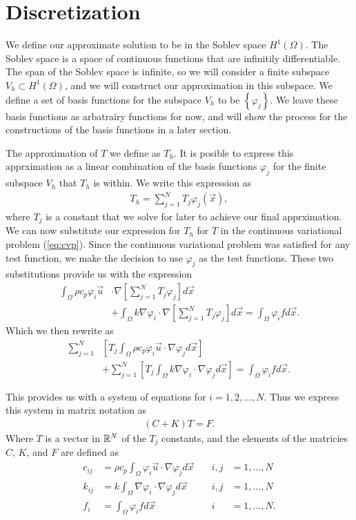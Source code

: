 \documentclass[../fem.tex]{subfiles}
\begin{document}
\section{Discretization}%
\label{sec:discretization}

We define our approximate solution to be in the Soblev space $H^1(\Omega)$. The
Soblev space is a space of continuous functions that are infinitily
differentiable. The span of the Soblev space is infinite, so we will consider a
finite subspace $V_h\subset H^1(\Omega)$, and we will construct our
approximation in this subspace. We define a set of basis functions for the
subspace $V_h$ to be $\left\{\varphi_j\right\}$. We leave these basis functions
as arbatrairy functions for now, and will show the process for the
constructions of the basis functions in a later section.

The approximation of $T$ we define as $T_h$. It is posible to express this
apprximation as a linear combination of the basis functions $\varphi_j$ for the
finite subspace $V_h$ that $T_h$ is within. We write this expression as
\begin{align}\label{eq:lin_approx}
  T_h=\sum_{j=1}^NT_j\varphi_j(\vec{x}),
\end{align}
where $T_j$ is a constant that we solve for later to achieve our final
apprximation. We can now substitute our expression for $T_h$ for $T$ in the
continuous variational problem (\ref{eq:cvp}). Since the continuous variational
problem was satisfied for any test function, we make the decision to use
$\varphi_j$ as the test functions. These two substitutions provide us with the
expression
\begin{align*}
  \int_\Omega\rho c_p \varphi_i\vec{u}&\cdot\nabla\left[\sum_{j=1}^NT_j\varphi_j\right]d\vec{x}\\
  &+\int_\Omega k\nabla
  \varphi_i\cdot\nabla\left[\sum_{j=1}^NT_j\varphi_j\right]d\vec{x}
  =\int_\Omega \varphi_ifd\vec{x}.
\end{align*}
Which we then rewrite as
\begin{align*}
  \sum_{j=1}^N&\left[T_j\int_\Omega\rho c_p\varphi_i\vec{u}\cdot\nabla\varphi_jd\vec{x}\right]\\
  &+ \sum_{j=1}^N\left[T_j\int_\Omega
  k\nabla\varphi_i\cdot\nabla\varphi_jd\vec{x}\right]=\int_\Omega\varphi_ifd\vec{x}.
\end{align*}

This provides us with a system of equations for $i=1,2,\ldots,N$. Thus we
express this system in matrix notation as
\begin{align}\label{eq:mat_rep}
  (C+K)T=F.
\end{align}
Where $T$ is a vector in $\mathbb{R}^N$ of the $T_j$ constants, and the elements of the
matricies $C$, $K$, and $F$ are defined as
\begin{align*}
  c_{ij}&=\rho c_p\int_\Omega\varphi_i\vec{u}\cdot\nabla\varphi_jd\vec{x}\quad
        &i,j&=1,\ldots,N\\
  k_{ij}&=k\int_\Omega\nabla\varphi_i\cdot\nabla\varphi_jd\vec{x}\quad
        &i,j&=1,\ldots,N\\
  f_i&=\int_\Omega\varphi_ifd\vec{x}\quad&i&=1,\ldots,N.
\end{align*}
\end{document}
